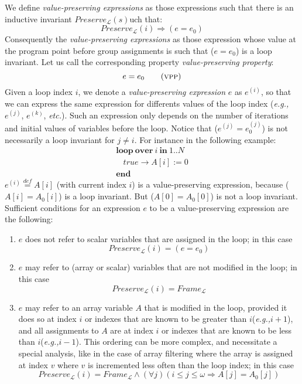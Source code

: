 \documentclass[a4paper,10pt]{article}
\newcommand{\eg}{\textit{e.g.,}\xspace}
\newcommand{\etc}{\textit{etc.}\xspace}
\newcommand{\prog}{\ensuremath{\mathcal{L}}\xspace}
\newcommand{\idx}{\ensuremath{i}\xspace}
\newcommand{\idxfinal}{\ensuremath{\omega}\xspace}
\newcommand{\KWloop}{\ensuremath{\mathrm{\textbf{loop}}~}}
\newcommand{\KWend}{\ensuremath{\mathrm{\textbf{end}}}}
\newcommand{\KWover}{\ensuremath{\mathrm{\textbf{over}}~}}
\newcommand{\KWin}{\ensuremath{~\mathrm{\textbf{in}}~}}
\newcommand{\at}[1]{{(#1)}}
\newcommand{\framecond}[1]{\ensuremath{\mathit{Frame_{#1}}}}
\newcommand{\preservecond}[2]{\ensuremath{\mathit{Preserve_{#1}(#2)}}}
\newcommand{\symdef}{\ensuremath{\overset{\mathit{def}}{=}}}
\newcommand{\vpp}{\textsc{vpp}\xspace}
\begin{document}
We define \textit{value-preserving expressions} as those expressions
such that there is an inductive invariant \preservecond{\prog} such that:
$$\preservecond{\prog}{\idx} \Rightarrow (e = e_0)$$
% 
Consequently the \textit{value-preserving expressions} as those expression
whose value at the program point before group assignments is such that ($e=e_0$) 
is a loop invariant. Let us call the corresponding property \textit{value-preserving property}:
\begin{equation}
 e=e_0 \tag{\vpp}
\end{equation}
%
Given a loop index \idx, we denote a \textit{value-preserving expression} $e$
as $e^\at{\idx}$, so that we can express the same expression for differents
values of the loop index (\eg $e^\at{j}$, $e^\at{k}$, \etc). Such an expression
only depends on the number of iterations and initial values of variables
before the loop. Notice that ($e^\at{j} = e_0^\at{j}$) is not necessarily a
loop invariant for $j \neq i$.  For instance in the following example:
$$\begin{array}{l}
  \KWloop \KWover i \KWin 1 .. N \\
  ~~~~ \mathit{true} \rightarrow A[i] := 0\\
  \KWend
\end{array}$$
$e^\at{\idx} \symdef A[\idx]$ (with current index \idx) is a 
value-preserving expression, because ($A[\idx]=A_0[\idx]$) is a loop 
invariant. But ($A[0]=A_0[0]$) is not a loop invariant.
%
Sufficient conditions for an expression $e$ to be a value-preserving expression
are the following:
\begin{enumerate}
\item $e$ does not refer to scalar variables that are assigned in the loop;
in this case $$\preservecond{\prog}{\idx} = (e = e_0)$$
\item $e$ may refer to (array or scalar) variables that are not modified in the loop;
in this case $$\preservecond{\prog}{\idx} = \framecond{\prog}$$
\item $e$ may refer to an array variable $A$ that is modified in the loop,
  provided it does so at index \idx or indexes that are known to be greater
  than \idx (\eg $\idx + 1$), and all assignments to $A$ are at index \idx or
  indexes that are known to be less than \idx (\eg $\idx - 1$). This ordering
  can be more complex, and necessitate a special analysis, like in the case of
  array filtering where the array is assigned at index $v$ where $v$ is
  incremented less often than the loop index; in this case 
$$\preservecond{\prog}{\idx} = \framecond{\prog} \land (\forall j)(\idx \leq j \leq \idxfinal \Rightarrow A[j]=A_0[j])$$
\end{enumerate}
\end{document}
